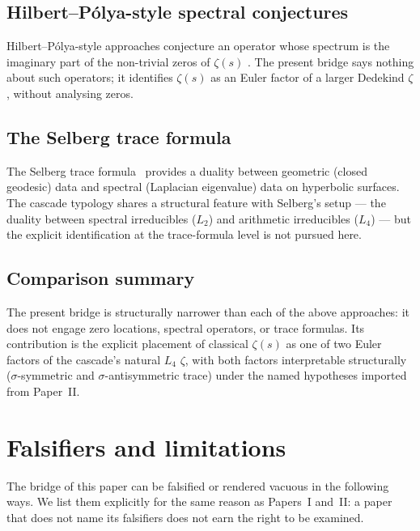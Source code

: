 \documentclass[11pt,a4paper]{article}
\theoremstyle{definition}
\theoremstyle{remark}
\begin{document}
\subsection{Hilbert--P\'olya-style spectral conjectures}

Hilbert--P\'olya-style approaches conjecture an operator whose spectrum
is the imaginary part of the non-trivial zeros of $\zeta(s)$
\cite{KeatingSnaith,BerryKeating1999}. The present bridge says nothing
about such operators; it identifies $\zeta(s)$ as an Euler factor of a
larger Dedekind $\zeta$, without analysing zeros.

\subsection{The Selberg trace formula}

The Selberg trace formula~\cite{Selberg1956} provides a duality
between geometric (closed geodesic) data and spectral (Laplacian
eigenvalue) data on hyperbolic surfaces. The cascade typology shares
a structural feature with Selberg's setup --- the duality between
spectral irreducibles ($L_2$) and arithmetic irreducibles ($L_4$) ---
but the explicit identification at the trace-formula level is not
pursued here.

\subsection{Comparison summary}

The present bridge is structurally narrower than each of the above
approaches: it does not engage zero locations, spectral operators, or
trace formulas. Its contribution is the explicit placement of classical
$\zeta(s)$ as one of two Euler factors of the cascade's natural $L_4$
$\zeta$, with both factors interpretable structurally
($\sigma$-symmetric and $\sigma$-antisymmetric trace) under the named
hypotheses imported from Paper~II.

\section{Falsifiers and limitations}\label{sec:falsifiers}

The bridge of this paper can be falsified or rendered vacuous in the
following ways. We list them explicitly for the same reason as Papers~I
and~II: a paper that does not name its falsifiers does not earn the
right to be examined.
\end{document}

